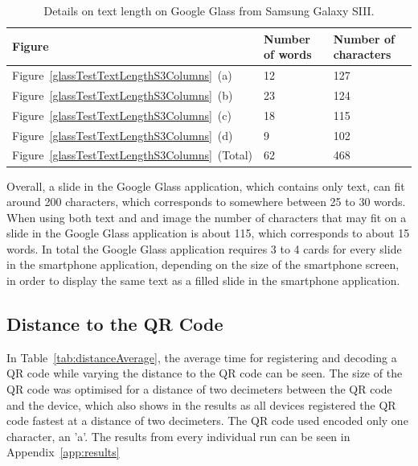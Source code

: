	\begin{table}[ht!]
    		\caption{Details on text length on Google Glass from Samsung Galaxy SIII.} \label{tab:glassTestTextLengthS3ColumnsTable}
		\centering \begin{tabularx}{\textwidth}{l|X|X} \hline
		\textbf{Figure} & \textbf{Number of words} & \textbf{Number of characters} \\ \hline \hline
       
		Figure~\ref{glassTestTextLengthS3Columns}~(a)	&12	&127	\\ \hline
		Figure~\ref{glassTestTextLengthS3Columns}~(b)	&23	&124	\\ \hline
		Figure~\ref{glassTestTextLengthS3Columns}~(c)	&18	&115	\\ \hline
		Figure~\ref{glassTestTextLengthS3Columns}~(d)	&9	&102	\\ \hline
		Figure~\ref{glassTestTextLengthS3Columns}~(Total)	&62	&468	\\ \hline
		
		\end{tabularx}
	\end{table}

Overall, a slide in the Google Glass application, which contains only text, can fit around 200 characters, which corresponds to somewhere between 25 to 30 words. When using both text and and image the number of characters that may fit on a slide in the Google Glass application is about 115, which corresponds to about 15 words. In total the Google Glass application requires 3 to 4 cards for every slide in the smartphone application, depending on the size of the smartphone screen, in order to display the same text as a filled slide in the smartphone application.

\subsection{Distance to the QR Code}

In Table~\ref{tab:distanceAverage}, the average time for registering and decoding a QR code while varying the distance to the QR code can be seen. The size of the QR code was optimised for a distance of two decimeters between the QR code and the device, which also shows in the results as all devices registered the QR code fastest at a distance of two decimeters. The QR code used encoded only one character, an 'a'. The results from every individual run can be seen in Appendix~\ref{app:results}

